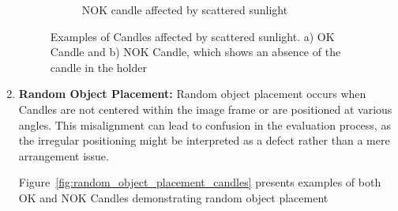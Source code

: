 \documentclass[12pt,DIV14,BCOR12mm,a4paper,footinclude=false,headinclude,parskip=half-,twoside,openright,cleardoublepage=empty,toc=index,bibliography=totoc,listof=totoc]{scrreprt}
\numberwithin{equation}{chapter}
\begin{document}
\begin{enumerate}
\begin{figure}
\begin{subfigure}[b]{0.45\textwidth}
            \caption{NOK candle affected by scattered sunlight}
        \end{subfigure}
        \caption{Examples of Candles affected by scattered sunlight. a) OK Candle and b) NOK Candle, which shows an absence of the candle in the holder}
        \label{fig:scattered_sunlight}
    \end{figure}
	  
		\item \textbf{Random Object Placement:} Random object placement occurs when Candles are not centered within the image frame or are positioned at various angles. This misalignment can lead to confusion in the evaluation process, as the irregular positioning might be interpreted as a defect rather than a mere arrangement issue.
	
Figure~\ref{fig:random_object_placement_candles} presents examples of both OK and NOK Candles demonstrating random object placement
	

\end{enumerate}
\end{document}
